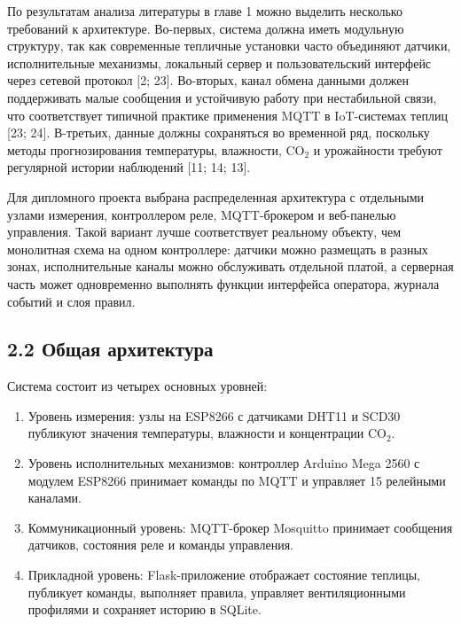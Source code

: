 \documentclass[a4paper,14pt]{extarticle}
\providecommand{\tightlist}{%
  \setlength{\itemsep}{0pt}\setlength{\parskip}{0pt}}
\begin{document}
По результатам анализа литературы в главе 1 можно выделить несколько
требований к архитектуре. Во-первых, система должна иметь модульную
структуру, так как современные тепличные установки часто объединяют
датчики, исполнительные механизмы, локальный сервер и пользовательский
интерфейс через сетевой протокол {[}2; 23{]}. Во-вторых, канал обмена
данными должен поддерживать малые сообщения и устойчивую работу при
нестабильной связи, что соответствует типичной практике применения MQTT
в IoT-системах теплиц {[}23; 24{]}. В-третьих, данные должны сохраняться
во временной ряд, поскольку методы прогнозирования температуры,
влажности, CO\(_2\) и урожайности требуют регулярной истории наблюдений
{[}11; 14; 13{]}.

Для дипломного проекта выбрана распределенная архитектура с отдельными
узлами измерения, контроллером реле, MQTT-брокером и веб-панелью
управления. Такой вариант лучше соответствует реальному объекту, чем
монолитная схема на одном контроллере: датчики можно размещать в разных
зонах, исполнительные каналы можно обслуживать отдельной платой, а
серверная часть может одновременно выполнять функции интерфейса
оператора, журнала событий и слоя правил.

\subsection{2.2 Общая
архитектура}\label{ux43eux431ux449ux430ux44f-ux430ux440ux445ux438ux442ux435ux43aux442ux443ux440ux430}

Система состоит из четырех основных уровней:

\begin{enumerate}
\def\labelenumi{\arabic{enumi})}
\tightlist
\item
  Уровень измерения: узлы на ESP8266 с датчиками DHT11 и SCD30 публикуют
  значения температуры, влажности и концентрации CO\(_2\).
\item
  Уровень исполнительных механизмов: контроллер Arduino Mega 2560 с
  модулем ESP8266 принимает команды по MQTT и управляет 15 релейными
  каналами.
\item
  Коммуникационный уровень: MQTT-брокер Mosquitto принимает сообщения
  датчиков, состояния реле и команды управления.
\item
  Прикладной уровень: Flask-приложение отображает состояние теплицы,
  публикует команды, выполняет правила, управляет вентиляционными
  профилями и сохраняет историю в SQLite.
\end{enumerate}
\end{document}
